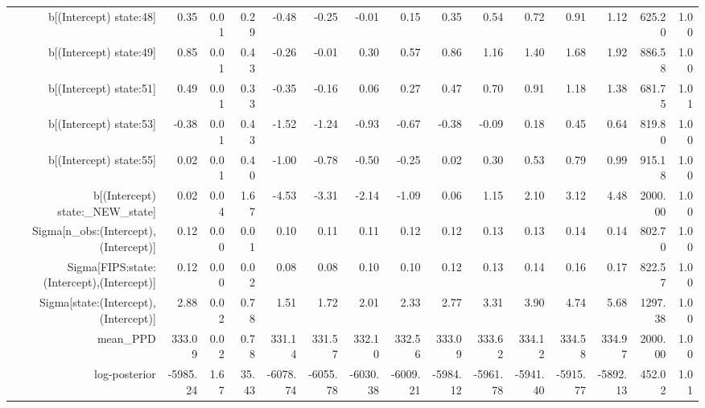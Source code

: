 \begin{table}[ht]
\begin{tabular}{rrrrrrrrrrrrrrr}
  b[(Intercept) state:48] & 0.35 & 0.01 & 0.29 & -0.48 & -0.25 & -0.01 & 0.15 & 0.35 & 0.54 & 0.72 & 0.91 & 1.12 & 625.20 & 1.00 \\ 
  b[(Intercept) state:49] & 0.85 & 0.01 & 0.43 & -0.26 & -0.01 & 0.30 & 0.57 & 0.86 & 1.16 & 1.40 & 1.68 & 1.92 & 886.58 & 1.00 \\ 
  b[(Intercept) state:51] & 0.49 & 0.01 & 0.33 & -0.35 & -0.16 & 0.06 & 0.27 & 0.47 & 0.70 & 0.91 & 1.18 & 1.38 & 681.75 & 1.01 \\ 
  b[(Intercept) state:53] & -0.38 & 0.01 & 0.43 & -1.52 & -1.24 & -0.93 & -0.67 & -0.38 & -0.09 & 0.18 & 0.45 & 0.64 & 819.80 & 1.00 \\ 
  b[(Intercept) state:55] & 0.02 & 0.01 & 0.40 & -1.00 & -0.78 & -0.50 & -0.25 & 0.02 & 0.30 & 0.53 & 0.79 & 0.99 & 915.18 & 1.00 \\ 
  b[(Intercept) state:\_NEW\_state] & 0.02 & 0.04 & 1.67 & -4.53 & -3.31 & -2.14 & -1.09 & 0.06 & 1.15 & 2.10 & 3.12 & 4.48 & 2000.00 & 1.00 \\ 
  Sigma[n\_obs:(Intercept),(Intercept)] & 0.12 & 0.00 & 0.01 & 0.10 & 0.11 & 0.11 & 0.12 & 0.12 & 0.13 & 0.13 & 0.14 & 0.14 & 802.70 & 1.00 \\ 
  Sigma[FIPS:state:(Intercept),(Intercept)] & 0.12 & 0.00 & 0.02 & 0.08 & 0.08 & 0.10 & 0.10 & 0.12 & 0.13 & 0.14 & 0.16 & 0.17 & 822.57 & 1.00 \\ 
  Sigma[state:(Intercept),(Intercept)] & 2.88 & 0.02 & 0.78 & 1.51 & 1.72 & 2.01 & 2.33 & 2.77 & 3.31 & 3.90 & 4.74 & 5.68 & 1297.38 & 1.00 \\ 
  mean\_PPD & 333.09 & 0.02 & 0.78 & 331.14 & 331.57 & 332.10 & 332.56 & 333.09 & 333.62 & 334.12 & 334.58 & 334.97 & 2000.00 & 1.00 \\ 
  log-posterior & -5985.24 & 1.67 & 35.43 & -6078.74 & -6055.78 & -6030.38 & -6009.21 & -5984.12 & -5961.78 & -5941.40 & -5915.77 & -5892.13 & 452.02 & 1.01 \\ 
   \hline
\end{tabular}
\end{table}
